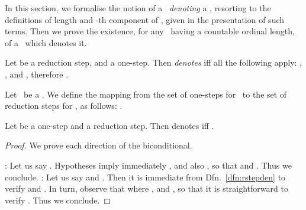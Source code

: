In this section, we formalise the notion of a \pnpterm\ \emph{denoting} a \redseq, resorting to the definitions of length and -th component of \pnpterms, given in the presentation of such terms.
Then we prove the existence, for any \redseq\ having a countable ordinal length, of a \pnpterm\ which denotes it. 




\begin{definition}
\label{dfn:redstep-denotation}
Let  be a reduction step, and  a one-step. 
Then  \emph{denotes}  iff all the following apply: , , and , therefore .
\end{definition}

\begin{definition}
\label{dfn:rstepden}
Let \trst\ be a \TRS. We define the mapping  from the set of one-steps for \trst\ to the set of reduction steps for \trst, as follows: 
.
\end{definition}

\begin{lemma}
\label{rsl:rstepden-denotes}
Let  be a one-step and  a reduction step. 
Then  denotes  iff .
\end{lemma}

\begin{proof}
We prove each direction of the biconditional. 

\noindent
:
Let us say . Hypotheses imply immediately , and also , so that  and . Thus we conclude.
\noindent
:
Let us say  and .
Then it is immediate from Dfn.~\ref{dfn:rstepden} to verify  and .
In turn, observe that  where , and
, so that it is straightforward to verify . Thus we conclude.
\end{proof}



